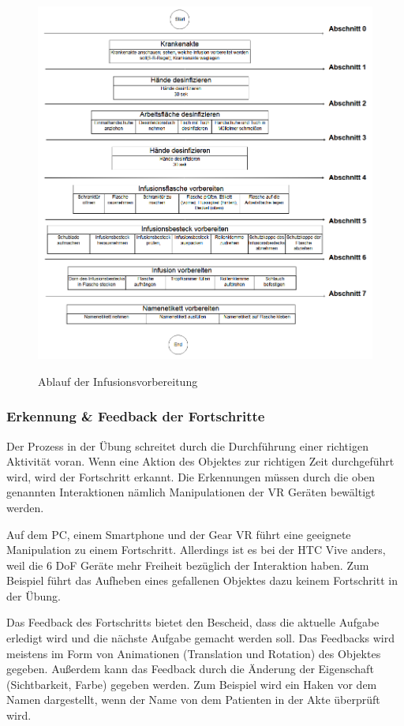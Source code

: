 \begin{figure}[ht]
\vspace*{1em}
\centering
\caption{Ablauf der Infusionsvorbereitung}
\includegraphics[width=\textwidth]{images/ablaufFertig.png}
\label{fig:AblaufInfusionsvorbereitung} 
\end{figure}
  
  \subsubsection{Erkennung \& Feedback der Fortschritte}
  Der Prozess in der Übung schreitet durch die Durchführung einer richtigen Aktivität voran. Wenn eine Aktion des Objektes zur richtigen Zeit durchgeführt wird, wird der Fortschritt erkannt. Die Erkennungen müssen durch die oben genannten Interaktionen nämlich Manipulationen der VR Geräten bewältigt werden.
  
  Auf dem PC, einem Smartphone und der Gear VR führt eine geeignete Manipulation zu einem Fortschritt. Allerdings ist es bei der HTC Vive anders, weil die 6 DoF Geräte mehr Freiheit bezüglich der Interaktion haben. Zum Beispiel führt das Aufheben eines gefallenen Objektes dazu keinem Fortschritt in der Übung. 
  
  Das Feedback des Fortschritts bietet den Bescheid, dass die aktuelle Aufgabe erledigt wird und die nächste Aufgabe gemacht werden soll. Das Feedbacks wird meistens im Form von Animationen (Translation und Rotation) des Objektes gegeben. Außerdem kann das Feedback durch die Änderung der Eigenschaft (Sichtbarkeit, Farbe) gegeben werden. Zum Beispiel wird ein Haken vor dem Namen dargestellt, wenn der Name von dem Patienten in der Akte überprüft wird.
  
